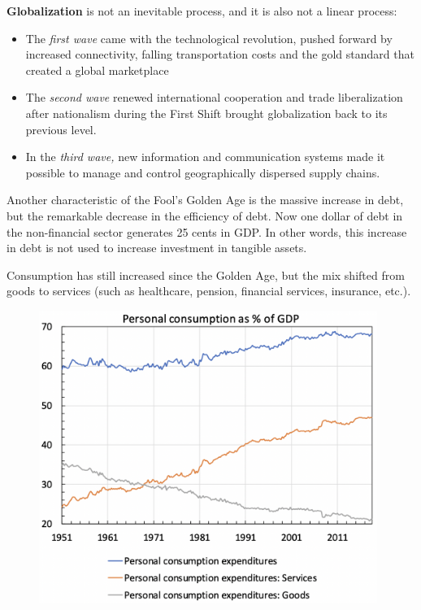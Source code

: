 \documentclass[a4paper]{extarticle}
\begin{document}
\textbf{Globalization} is not an inevitable process, and it is also not a linear process:

\begin{itemize}
    \item The \textit{first wave} came with the technological revolution, pushed forward by increased connectivity, falling transportation costs and the gold standard that created a global marketplace
    \item The \textit{second wave} renewed international cooperation and trade liberalization after nationalism during the First Shift brought globalization back to its previous level.
    \item In the \textit{third wave,} new information and communication systems made it possible to manage and control geographically dispersed supply chains. 
\end{itemize}

Another characteristic of the Fool's Golden Age is the massive increase in debt, but the remarkable decrease in the efficiency of debt. Now one dollar of debt in the non-financial sector generates 25 cents in GDP. In other words, this increase in debt is not used to increase investment in tangible assets.

Consumption has still increased since the Golden Age, but the mix shifted from goods to services (such as healthcare, pension, financial services, insurance, etc.).

\begin{figure}[H]
    \includegraphics[width=11cm]{../images/EnpRisk_Fig9-2}
    \centering
\end{figure}
\end{document}
